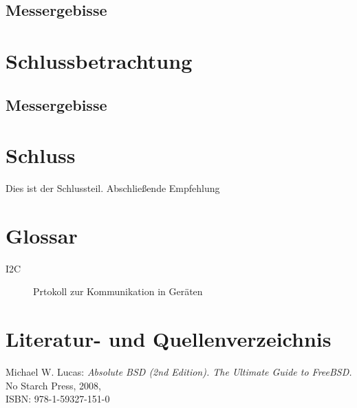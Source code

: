 \documentclass[a4paper,12pt]{scrartcl}
\begin{document}
\subsection{Messergebisse}

\clearpage
\section{Schlussbetrachtung}
\subsection{Messergebisse}




\clearpage
\section{Schluss}
Dies ist der Schlussteil. Abschlie\ss{}ende Empfehlung

\clearpage
\section{Glossar}
\begin{description}
 \item[I2C] Prtokoll zur Kommunikation in Ger\"aten
\end{description}

\clearpage
\section{Literatur- und Quellenverzeichnis}

\renewcommand\refname{Literaturverzeichnis}
\begin{thebibliography}{999}

Michael W. Lucas:  {\sl Absolute BSD (2nd Edition). The Ultimate Guide to FreeBSD.} No Starch Press, 2008,
\\ISBN: 978-1-59327-151-0

\end{thebibliography}
\end{document}
